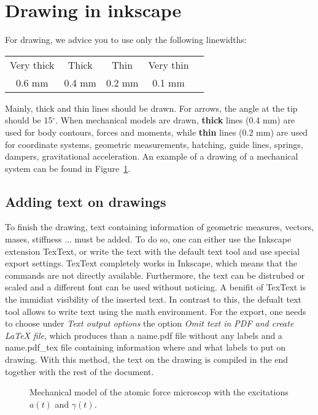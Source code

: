 \documentclass[a4paper,10pt,english]{article}
\begin{document}
\section{Drawing in inkscape}
%
For drawing, we advice you to use only the following linewidths:
%
\begin{center}

\begin{tabular}{ccccc}
	\toprule
	Very thick 
		& Thick
		& Thin
		& Very thin \\[2mm]
	0.6 mm 
		& 0.4 mm 
		& 0.2 mm
		& 0.1 mm \\
	\bottomrule
\end{tabular}
\end{center}
%
Mainly, thick and thin lines should be drawn. For arrows, the angle at the tip should be 15$^\circ$. When mechanical models are drawn, \textbf{thick} lines (0.4 mm) are used for body contours, forces and moments, while \textbf{thin} lines (0.2 mm) are used for coordinate systems, geometric measurements, hatching, guide lines, springs, dampers, gravitational acceleration. An example of a drawing of a mechanical system can be found in Figure~\ref{fig:AFM}.
%
\subsection{Adding text on drawings}
%
To finish the drawing, text containing information of geometric measures, vectors, mases, stiffness $\dots$ must be added. To do so, one can either use the Inkscape extension TexText, or write the text with the default text tool and use special export settings. TexText completely works in Inkscape, which means that the commands are not directly available. Furthermore, the text can be distrubed or scaled and a different font can be used without noticing. A benifit of TexText is the immidiat visibility of the inserted text. In contrast to this, the defualt text tool allows to write text using the math environment. For the export, one needs to choose under \textit{Text output options} the option \textit{Omit text in PDF and create LaTeX file}, which produces than a name.pdf file without any labels and a name.pdf\_tex file containing information where and what labels to put on drawing. With this method, the text on the drawing is compiled in the end together with the rest of the document. 
%
\begin{figure}
	\centering
	
	\caption{Mechanical model of the atomic force microscop with the excitations $a(t)$ and $\gamma(t)$. }
	\label{fig:AFM}
\end{figure}
%
\end{document}
